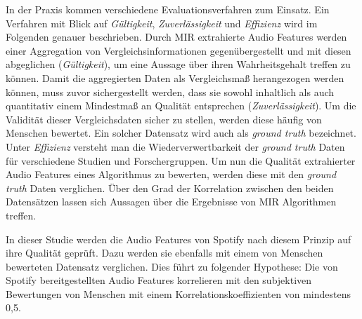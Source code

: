 In der Praxis kommen verschiedene Evaluationsverfahren zum Einsatz.
Ein Verfahren mit Blick auf \textit{Gültigkeit}, \textit{Zuverlässigkeit} und \textit{Effizienz} \cite{Urbano_2013} wird im Folgenden genauer beschrieben.
Durch MIR extrahierte Audio Features werden einer Aggregation von Vergleichsinformationen gegenübergestellt und mit diesen abgeglichen (\textit{Gültigkeit}), um eine Aussage über ihren Wahrheitsgehalt treffen zu können.
Damit die aggregierten Daten als Vergleichsmaß herangezogen werden können, muss zuvor sichergestellt werden, dass sie sowohl inhaltlich als auch quantitativ einem Mindestmaß an Qualität entsprechen (\textit{Zuverlässigkeit}).
Um die Validität dieser Vergleichsdaten sicher zu stellen, werden diese häufig von Menschen bewertet.
Ein solcher Datensatz wird auch als \textit{ground truth} bezeichnet.
Unter \textit{Effizienz} versteht man die Wiederverwertbarkeit der \textit{ground truth} Daten für verschiedene Studien und Forschergruppen.
Um nun die Qualität extrahierter Audio Features eines Algorithmus zu bewerten, werden diese mit den \textit{ground truth} Daten verglichen.
Über den Grad der Korrelation zwischen den beiden Datensätzen lassen sich Aussagen über die Ergebnisse von MIR Algorithmen treffen.

In dieser Studie werden die Audio Features von Spotify nach diesem Prinzip auf ihre Qualität geprüft.
Dazu werden sie ebenfalls mit einem von Menschen bewerteten Datensatz verglichen.
Dies führt zu folgender Hypothese:
Die von Spotify bereitgestellten Audio Features korrelieren mit den subjektiven Bewertungen von Menschen mit einem Korrelationskoeffizienten von mindestens 0,5.
